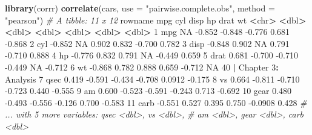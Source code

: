 \documentclass[
]{article}
\newenvironment{Shaded}{\begin{snugshade}}{\end{snugshade}}
\newcommand{\CommentTok}[1]{\textcolor[rgb]{0.56,0.35,0.01}{\textit{#1}}}
\newcommand{\DataTypeTok}[1]{\textcolor[rgb]{0.13,0.29,0.53}{#1}}
\newcommand{\DecValTok}[1]{\textcolor[rgb]{0.00,0.00,0.81}{#1}}
\newcommand{\ErrorTok}[1]{\textcolor[rgb]{0.64,0.00,0.00}{\textbf{#1}}}
\newcommand{\FloatTok}[1]{\textcolor[rgb]{0.00,0.00,0.81}{#1}}
\newcommand{\KeywordTok}[1]{\textcolor[rgb]{0.13,0.29,0.53}{\textbf{#1}}}
\newcommand{\NormalTok}[1]{#1}
\newcommand{\OperatorTok}[1]{\textcolor[rgb]{0.81,0.36,0.00}{\textbf{#1}}}
\newcommand{\OtherTok}[1]{\textcolor[rgb]{0.56,0.35,0.01}{#1}}
\newcommand{\StringTok}[1]{\textcolor[rgb]{0.31,0.60,0.02}{#1}}
\begin{document}
\begin{Shaded}
\begin{Highlighting}[]
\KeywordTok{library}\NormalTok{(corrr)}
\KeywordTok{correlate}\NormalTok{(cars, }\DataTypeTok{use =} \StringTok{"pairwise.complete.obs"}\NormalTok{, }\DataTypeTok{method =} \StringTok{"pearson"}\NormalTok{)}
\CommentTok{# A tibble: 11 x 12}
\NormalTok{ rowname mpg cyl disp hp drat wt}
 \OperatorTok{<}\NormalTok{chr}\OperatorTok{>}\StringTok{ }\ErrorTok{<}\NormalTok{dbl}\OperatorTok{>}\StringTok{ }\ErrorTok{<}\NormalTok{dbl}\OperatorTok{>}\StringTok{ }\ErrorTok{<}\NormalTok{dbl}\OperatorTok{>}\StringTok{ }\ErrorTok{<}\NormalTok{dbl}\OperatorTok{>}\StringTok{ }\ErrorTok{<}\NormalTok{dbl}\OperatorTok{>}\StringTok{ }\ErrorTok{<}\NormalTok{dbl}\OperatorTok{>}
\StringTok{ }\DecValTok{1}\NormalTok{ mpg }\OtherTok{NA} \FloatTok{-0.852} \FloatTok{-0.848} \FloatTok{-0.776} \FloatTok{0.681} \FloatTok{-0.868}
 \DecValTok{2}\NormalTok{ cyl }\FloatTok{-0.852} \OtherTok{NA} \FloatTok{0.902} \FloatTok{0.832} \FloatTok{-0.700} \FloatTok{0.782}
 \DecValTok{3}\NormalTok{ disp }\FloatTok{-0.848} \FloatTok{0.902} \OtherTok{NA} \FloatTok{0.791} \FloatTok{-0.710} \FloatTok{0.888}
 \DecValTok{4}\NormalTok{ hp }\FloatTok{-0.776} \FloatTok{0.832} \FloatTok{0.791} \OtherTok{NA} \FloatTok{-0.449} \FloatTok{0.659}
 \DecValTok{5}\NormalTok{ drat }\FloatTok{0.681} \FloatTok{-0.700} \FloatTok{-0.710} \FloatTok{-0.449} \OtherTok{NA} \FloatTok{-0.712}
 \DecValTok{6}\NormalTok{ wt }\FloatTok{-0.868} \FloatTok{0.782} \FloatTok{0.888} \FloatTok{0.659} \FloatTok{-0.712} \OtherTok{NA}
\DecValTok{40} \OperatorTok{|}\StringTok{ }\NormalTok{Chapter }\DecValTok{3}\OperatorTok{:}\StringTok{ }\NormalTok{Analysis}
 \DecValTok{7}\NormalTok{ qsec }\FloatTok{0.419} \FloatTok{-0.591} \FloatTok{-0.434} \FloatTok{-0.708} \FloatTok{0.0912} \FloatTok{-0.175}
 \DecValTok{8}\NormalTok{ vs }\FloatTok{0.664} \FloatTok{-0.811} \FloatTok{-0.710} \FloatTok{-0.723} \FloatTok{0.440} \FloatTok{-0.555}
 \DecValTok{9}\NormalTok{ am }\FloatTok{0.600} \FloatTok{-0.523} \FloatTok{-0.591} \FloatTok{-0.243} \FloatTok{0.713} \FloatTok{-0.692}
\DecValTok{10}\NormalTok{ gear }\FloatTok{0.480} \FloatTok{-0.493} \FloatTok{-0.556} \FloatTok{-0.126} \FloatTok{0.700} \FloatTok{-0.583}
\DecValTok{11}\NormalTok{ carb }\FloatTok{-0.551} \FloatTok{0.527} \FloatTok{0.395} \FloatTok{0.750} \FloatTok{-0.0908} \FloatTok{0.428}
\CommentTok{# ... with 5 more variables: qsec <dbl>, vs <dbl>,}
\CommentTok{# am <dbl>, gear <dbl>, carb <dbl>}
\end{Highlighting}
\end{Shaded}
\end{document}
